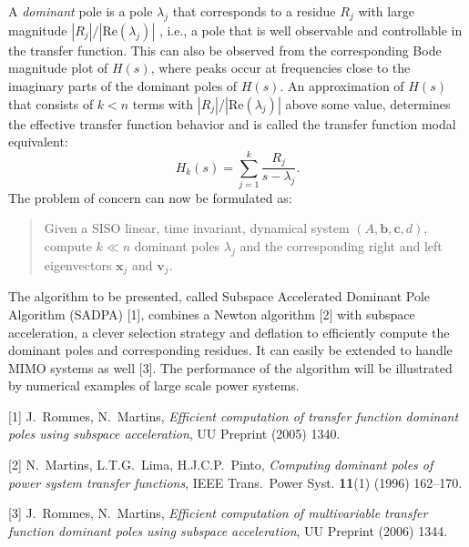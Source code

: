 \documentclass{report}
\begin{document}
A \textit{dominant} pole is a pole $\lambda_j$ that
corresponds to a residue $R_j$ with large magnitude
$|R_j| / |\mbox{Re}(\lambda_j)|$ , i.e.,
a pole that is well
observable and controllable in the transfer function. This
can also be observed from the corresponding Bode magnitude
plot of $H(s)$, where peaks occur at frequencies close to
the imaginary parts of the dominant poles of $H(s)$. An
approximation of $H(s)$ that consists of $k<n$ terms with
$|R_j|/|\mbox{Re}(\lambda_j)|$ above some value, determines
the effective transfer function behavior and is called the
transfer function modal equivalent:
$$ H_k(s) = \sum_{j=1}^k \frac{R_j}{s - \lambda_j}. $$
The problem of concern can now be formulated as:
\begin{quote}
Given a SISO linear, time invariant,
dynamical system
$(A,\mathbf{b},\mathbf{c},d)$,
compute $k\ll n$ dominant
poles $\lambda_j$ and the corresponding right and left
eigenvectors $\mathbf{x}_j$ and $\mathbf{v}_j$.
\end{quote}

The algorithm to be presented, called Subspace Accelerated
Dominant Pole Algorithm (SADPA) [1],
combines a Newton
algorithm [2]
with subspace
acceleration, a clever selection strategy and deflation to
efficiently compute the dominant poles and corresponding
residues. It can easily be extended to handle MIMO systems
as well [3].
The performance of the algorithm will be illustrated by
numerical examples of large scale power systems.

[1] J.~Rommes, N.~Martins, {\em Efficient computation
of transfer function dominant poles using subspace
acceleration}, UU Preprint (2005) 1340.

[2] N.~Martins, L.T.G.~Lima, H.J.C.P.~Pinto,
{\em Computing dominant poles of power system transfer
functions}, IEEE Trans.~Power Syst. {\bf 11}(1)
(1996) 162--170.

[3] J.~Rommes, N.~Martins,
{\em Efficient computation of multivariable transfer
function dominant poles using subspace acceleration},
UU Preprint (2006) 1344.



\end{document}
